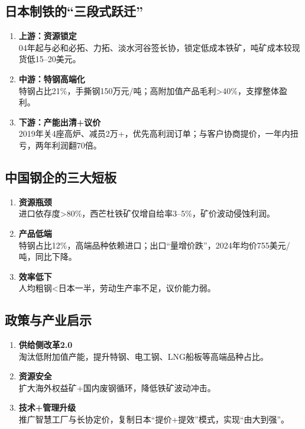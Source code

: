 \subsection{日本制铁的“三段式跃迁”}
\begin{enumerate}[leftmargin=*, nosep]
    \item \textbf{上游：资源锁定}  \\
    04年起与必和必拓、力拓、淡水河谷签长协，锁定低成本铁矿，吨矿成本较现货低15–20美元。
    \item \textbf{中游：特钢高端化}  \\
    特钢占比21\%，手撕钢150万元/吨；高附加值产品毛利>40\%，支撑整体盈利。
    \item \textbf{下游：产能出清+议价}  \\
    2019年关4座高炉、减员2万+，优先高利润订单；与客户协商提价，一年内扭亏，两年利润翻70倍。
\end{enumerate}

\subsection{中国钢企的三大短板}
\begin{enumerate}[leftmargin=*, nosep]
    \item \textbf{资源瓶颈}  \\
    进口依存度>80\%，西芒杜铁矿仅增自给率3–5\%，矿价波动侵蚀利润。
    \item \textbf{产品低端}  \\
    特钢占比12\%，高端品种依赖进口；出口“量增价跌”，2024年均价755美元/吨，同比下降。
    \item \textbf{效率低下}  \\
    人均粗钢<日本一半，劳动生产率不足，议价能力弱。
\end{enumerate}

\subsection{政策与产业启示}
\begin{enumerate}[leftmargin=*, nosep]
    \item \textbf{供给侧改革2.0}  \\
    淘汰低附加值产能，提升特钢、电工钢、LNG船板等高端品种占比。
    \item \textbf{资源安全}  \\
    扩大海外权益矿+国内废钢循环，降低铁矿波动冲击。
    \item \textbf{技术+管理升级}  \\
    推广智慧工厂与长协定价，复制日本“提价+提效”模式，实现“由大到强”。
\end{enumerate}

